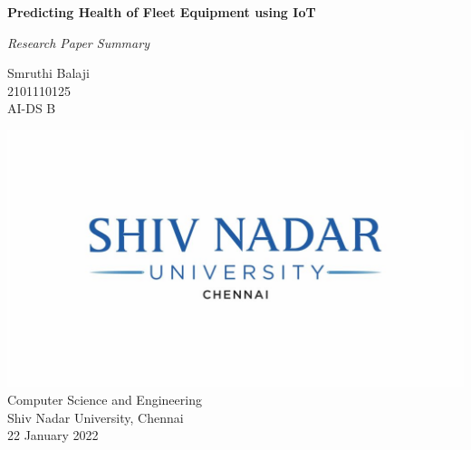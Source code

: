 \begin{titlepage}
    \centering
        \vspace*{2cm}
        \Huge
        \textbf{Predicting Health of Fleet Equipment using IoT}
        
        \vspace*{0.6cm}
        \Large
        \textit{Research Paper Summary}
        
        \normalsize
        \vspace*{1.5cm}
        Smruthi Balaji\\
        \vspace{0.2cm}
        2101110125\\
        \vspace{0.2cm}
        AI-DS B\\
        
        \vfill
        
        
        
        
        \vfill
        
        
        \includegraphics{logo3}\\
        Computer Science and Engineering\\
        Shiv Nadar University, Chennai\\
        22 January 2022
        \vspace*{1cm}
    
\end{titlepage}
